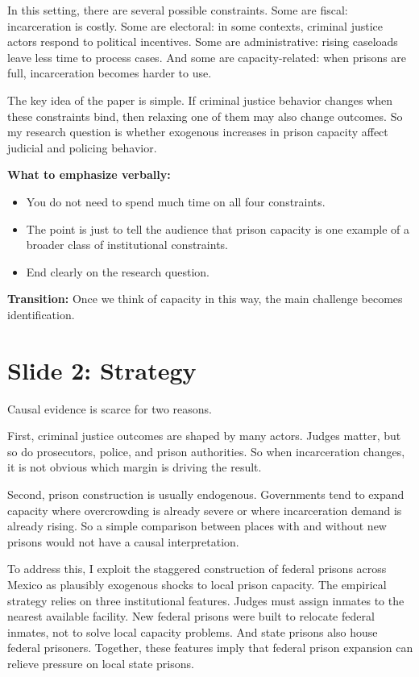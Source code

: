 \documentclass[11pt]{article}
\begin{document}
In this setting, there are several possible constraints. Some are fiscal: incarceration is costly. Some are electoral: in some contexts, criminal justice actors respond to political incentives. Some are administrative: rising caseloads leave less time to process cases. And some are capacity-related: when prisons are full, incarceration becomes harder to use.

The key idea of the paper is simple. If criminal justice behavior changes when these constraints bind, then relaxing one of them may also change outcomes. So my research question is whether exogenous increases in prison capacity affect judicial and policing behavior.

\textbf{What to emphasize verbally:}
\begin{itemize}[leftmargin=1.5em]
    \item You do not need to spend much time on all four constraints.
    \item The point is just to tell the audience that prison capacity is one example of a broader class of institutional constraints.
    \item End clearly on the research question.
\end{itemize}

\textbf{Transition:} Once we think of capacity in this way, the main challenge becomes identification.

\section{Slide 2: Strategy}
Causal evidence is scarce for two reasons.

First, criminal justice outcomes are shaped by many actors. Judges matter, but so do prosecutors, police, and prison authorities. So when incarceration changes, it is not obvious which margin is driving the result.

Second, prison construction is usually endogenous. Governments tend to expand capacity where overcrowding is already severe or where incarceration demand is already rising. So a simple comparison between places with and without new prisons would not have a causal interpretation.

To address this, I exploit the staggered construction of federal prisons across Mexico as plausibly exogenous shocks to local prison capacity. The empirical strategy relies on three institutional features. Judges must assign inmates to the nearest available facility. New federal prisons were built to relocate federal inmates, not to solve local capacity problems. And state prisons also house federal prisoners. Together, these features imply that federal prison expansion can relieve pressure on local state prisons.
\end{document}
